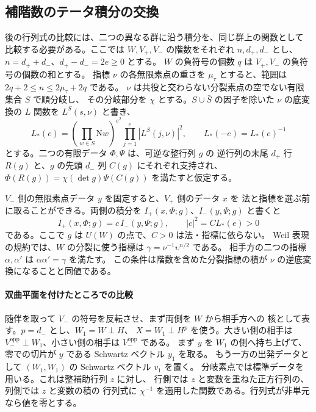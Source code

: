 \subsection{補階数のテータ積分の交換}\label{sec:exchange-proof}

後の行列式の比較には、二つの異なる群に沿う積分を、同じ群上の関数として
比較する必要がある。ここでは \(W,V_+,V_-\) の階数をそれぞれ
\(n,d_+,d_-\) とし、\(n=d_++d_-\)、\(d_+-d_-=2e\ge0\) とする。
\(W\) の負符号の個数 \(q\) は \(V_+,V_-\) の負符号の個数の和とする。
指標 \(\nu\) の各無限素点の重さを \(\mu_\tau\) とすると、範囲は
\(2q+2\le n\le2\mu_\tau+2q\) である。
\(\nu\) は共役と交わらない分裂素点の空でない有限集合 \(S\) で順分岐し、
その分岐部分を \(\chi\) とする。\(S\cup\bar S\) の因子を除いた
\(\nu\) の底変換の \(L\) 関数を \(L^S(s,\nu)\) と書き、
\begin{equation}\label{eq:exchange-lstar}
 L_*(e)=\left(\prod_{w\in S}\mathrm Nw\right)^{e^2}
             \prod_{j=1}^{e}|L^S(j,\nu)|^2,\qquad
 L_*(-e)=L_*(e)^{-1}
\end{equation}
とする。二つの有限データ \(\Phi,\Psi\) は、可逆な整行列 \(g\) の
逆行列の末尾 \(d_+\) 行 \(R(g)\) と、\(g\) の先頭 \(d_-\) 列 \(C(g)\)
にそれぞれ支持され、
\(\Phi(R(g))=\chi(\det g)\Psi(C(g))\) を満たすと仮定する。

\(V_-\) 側の無限素点データ \(y\) を固定すると、\(V_+\) 側のデータ \(x\) を
法と指標を選ぶ前に取ることができる。両側の積分を
\(I_+(x,\Phi;g)\)、\(I_-(y,\Psi;g)\) と書くと
\begin{equation}\label{eq:exchanged-integrals}
 I_+(x,\Phi;g)=c\, I_-(y,\Psi;g),\qquad
 |c|^2=C L_*(e)>0
\end{equation}
である。ここで \(g\) は \(U(W)\) の点で、\(C>0\) は法・指標に依らない。
Weil 表現の規約では、\(W\) の分裂に使う指標は
\(\gamma=\nu^{-1}\upsilon^{n/2}\) である。
相手方の二つの指標 \(\alpha,\alpha'\) は \(\alpha\alpha'=\gamma\) を満たす。
この条件は階数を含めた分裂指標の積が \(\nu\) の逆底変換になることと同値である。

\paragraph{双曲平面を付けたところでの比較}
随伴を取って \(V_-\) の符号を反転させ、まず両側を \(W\) から相手方への
核として表す。\(p=d_-\) とし、\(W_1=W\perp H\)、
\(X=W_1\perp H^{p}\) を使う。大きい側の相手は
\(V_-^{\mathrm{opp}}\perp W_1\)、小さい側の相手は \(V_-^{\mathrm{opp}}\) である。
まず \(y\) を \(W_1\) の側へ持ち上げて、零での切片が \(y\) である
Schwartz ベクトル \(y_1\) を取る。
もう一方の出発データとして \((W_1,W_1)\) の Schwartz ベクトル \(v_1\) を置く。
分岐素点では標準データを用いる。これは整補助行列 \(z\) に対し、
行側では \(z\) と変数を重ねた正方行列の、列側では \(z\) と変数の積の
行列式に \(\chi^{-1}\) を適用した関数である。行列式が非単元なら値を零とする。

